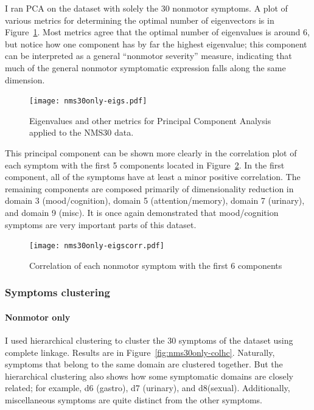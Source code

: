 \documentclass[10pt]{article}
\begin{document}
\begin{multicols}{2}
I ran PCA on the dataset with solely the 30 nonmotor symptoms. A plot of various metrics for
determining the optimal number of eigenvectors is in Figure~\ref{fig:nms30only-eigs}. Most metrics agree
that the optimal number of eigenvalues is around 6, but notice how one component has by far the
highest eigenvalue; this component can be interpreted as a general ``nonmotor severity'' measure,
indicating that much of the general nonmotor symptomatic expression falls along the same dimension.

\begin{figure}[H]
  \centering
  \texttt{[image: nms30only-eigs.pdf]}
  \caption{Eigenvalues and other metrics for Principal Component Analysis applied to the NMS30 data.}
  \label{fig:nms30only-eigs}
\end{figure}

This principal component can be shown more clearly in the correlation plot of each symptom with the
first 5 components located in Figure~\ref{fig:nms30only-eigscorr}. In the first component, all of the
symptoms have at least a minor positive correlation. The remaining components are composed
primarily of dimensionality reduction in domain 3 (mood/cognition), domain 5 (attention/memory),
domain 7 (urinary), and domain 9 (misc). It is once again demonstrated that mood/cognition symptoms
are very important parts of this dataset.

\begin{figure}[t]
  \centering
  \texttt{[image: nms30only-eigscorr.pdf]}
  \caption{Correlation of each nonmotor symptom with the first 6 components}
  \label{fig:nms30only-eigscorr}
\end{figure}

\subsubsection{Symptoms clustering}

\paragraph{Nonmotor only}

I used hierarchical clustering to cluster the 30 symptoms of the dataset using complete linkage.
Results are in Figure~\ref{fig:nms30only-colhc}. Naturally, symptoms that belong to the same domain are
clustered together. But the hierarchical clustering also shows how some symptomatic domains are
closely related; for example, d6 (gastro), d7 (urinary), and d8(sexual). Additionally,
miscellaneous symptoms are quite distinct from the other symptoms.


\end{multicols}
\end{document}
